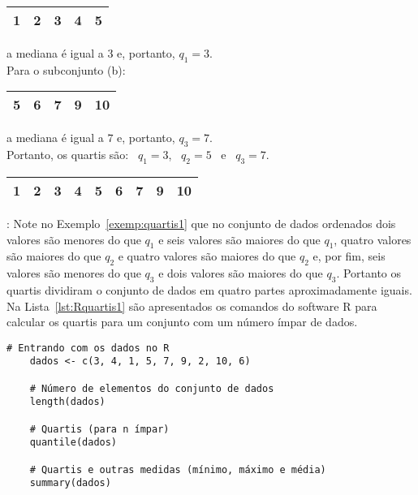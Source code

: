 \documentclass[11pt,fleqn]{book} %
\begin{document}
\begin{example}
\begin{center}
	\begin{tabular}{c c c c c}
	\hline
	1 & 2 & \textcolor{ocre}{\bf 3} & 4 & 5 \\
	\hline
	\end{tabular}
\end{center}

\noindent a mediana é igual a $3$ e, portanto, $q_1=3$. \\

Para o subconjunto (b):

\begin{center}
	\begin{tabular}{c c c c c}
	\hline
	5 & 6 & \textcolor{ocre}{\bf 7} & 9 & 10 \\
	\hline
	\end{tabular}
\end{center}

\noindent a mediana é igual a $7$ e, portanto, $q_3=7$. \\


Portanto, os quartis são: \, $q_1=3$, \, $q_2=5$ \, e \, $q_3=7$. 

\begin{center}
	\begin{tabular}{c c c c c c c c c}
	\hline
	1 & 2 & \textcolor{ocre}{\bf 3} & 4 & \textcolor{ocre}{\bf 5} & 6 & 7 & \textcolor{ocre}{\bf 9} & 10 \\
	\hline
	\end{tabular}
\end{center}

\end{example}

: Note no Exemplo~\ref{exemp:quartis1} que no conjunto de dados ordenados dois valores são menores do que $q_1$ e seis valores são maiores do que $q_1$, quatro valores são maiores do que $q_2$ e quatro valores são maiores do que $q_2$ e, por fim, seis valores são menores do que $q_3$ e dois valores são maiores do que $q_3$. Portanto os quartis dividiram o conjunto de dados em quatro partes aproximadamente iguais. \\

Na Lista~\ref{lst:Rquartis1} são apresentados os comandos do software R para calcular os quartis para um conjunto com um número ímpar de dados. \\

\begin{scriptsize}
	\estiloR
	\begin{lstlisting}[caption={Comandos do software R}, label=lst:Rquartis1]
	# Entrando com os dados no R
	dados <- c(3, 4, 1, 5, 7, 9, 2, 10, 6)
	
	# Número de elementos do conjunto de dados
	length(dados)

	# Quartis (para n ímpar)
	quantile(dados)

	# Quartis e outras medidas (mínimo, máximo e média)
	summary(dados)

	\end{lstlisting}
\end{scriptsize}
\end{document}
